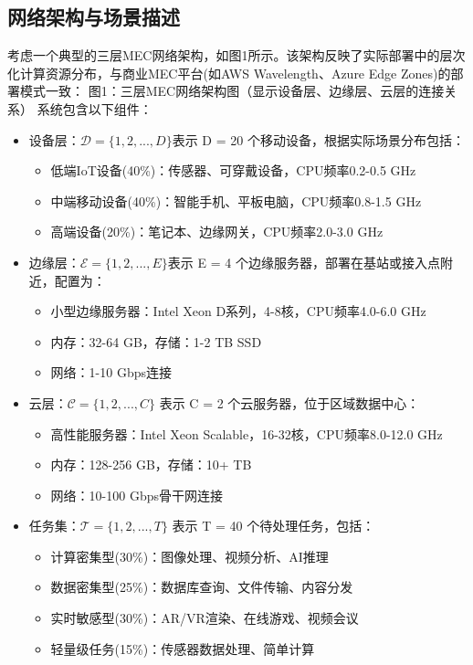 \documentclass[conference]{IEEEtran}
\begin{document}
\subsection{网络架构与场景描述}\label{AA}
考虑一个典型的三层MEC网络架构，如图1所示。该架构反映了实际部署中的层次化计算资源分布，与商业MEC平台(如AWS Wavelength、Azure Edge Zones)的部署模式一致：
图1：三层MEC网络架构图（显示设备层、边缘层、云层的连接关系）
系统包含以下组件：
\begin{itemize}
    \item 设备层：$\mathcal{D} = \{1, 2, ..., D\}$表示 D = 20 个移动设备，根据实际场景分布包括：
    \begin{itemize}
        \item 低端IoT设备(40\%)：传感器、可穿戴设备，CPU频率0.2-0.5 GHz
        \item 中端移动设备(40\%)：智能手机、平板电脑，CPU频率0.8-1.5 GHz
        \item 高端设备(20\%)：笔记本、边缘网关，CPU频率2.0-3.0 GHz
    \end{itemize}
    \item 边缘层：$\mathcal{E} = \{1, 2, ..., E\}$表示 E = 4 个边缘服务器，部署在基站或接入点附近，配置为：
    \begin{itemize}
        \item 小型边缘服务器：Intel Xeon D系列，4-8核，CPU频率4.0-6.0 GHz
        \item 内存：32-64 GB，存储：1-2 TB SSD
        \item 网络：1-10 Gbps连接
    \end{itemize}
     \item 云层：$\mathcal{C} = \{1, 2, ..., C\}$ 表示 C = 2 个云服务器，位于区域数据中心：
    \begin{itemize}
        \item 高性能服务器：Intel Xeon Scalable，16-32核，CPU频率8.0-12.0 GHz
        \item 内存：128-256 GB，存储：10+ TB
        \item 网络：10-100 Gbps骨干网连接
    \end{itemize}
    \item 任务集：$\mathcal{T} = \{1, 2, ..., T\}$ 表示 T = 40 个待处理任务，包括：
    \begin{itemize}
        \item 计算密集型(30\%)：图像处理、视频分析、AI推理
        \item 数据密集型(25\%)：数据库查询、文件传输、内容分发
        \item 实时敏感型(30\%)：AR/VR渲染、在线游戏、视频会议
        \item 轻量级任务(15\%)：传感器数据处理、简单计算
    \end{itemize}
\end{itemize}
\end{document}

